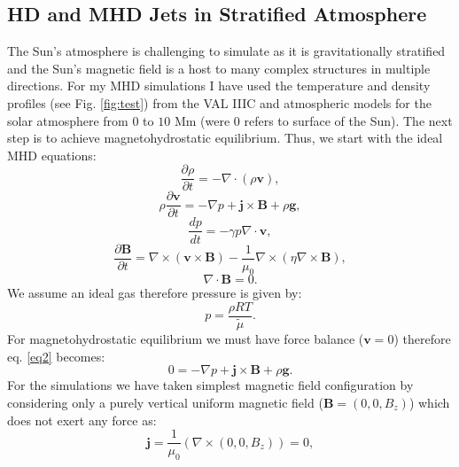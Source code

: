 \documentclass[12pt,a4paper,twoside]{article}
\begin{document}
\subsection{HD and MHD Jets in Stratified Atmosphere}
The Sun's atmosphere is challenging to simulate as it is gravitationally stratified and the Sun's magnetic field is a host to many complex structures in multiple directions. For my MHD simulations I have used the temperature and density profiles (see Fig. \ref{fig:test}) from the VAL IIIC \citep{Vernazza1981} and \cite{McWhirter1975} atmospheric models for the solar atmosphere from $0$ to $10$ Mm (were 0 refers to surface of the Sun). The next step is to achieve magnetohydrostatic equilibrium. Thus, we start with the ideal MHD equations: 
\begin{equation}\label{eq1}
\frac{\partial \rho}{\partial t} = - \nabla \cdot (\rho \boldsymbol{v} ) ,
\end{equation}
\begin{equation}\label{eq2}
\rho \frac{\partial \boldsymbol{v}}{\partial t} = -\nabla p + \boldsymbol{j} \times \boldsymbol{B} + \rho \boldsymbol{g} ,
\end{equation}
\begin{equation}\label{eq3}
\frac{d p}{d t} = - \gamma p \nabla \cdot \boldsymbol{v} ,
\end{equation}
\begin{equation}\label{eq4}
\frac{\partial \boldsymbol{B}}{\partial t} = \nabla \times (\boldsymbol{v} \times \boldsymbol{B}) - \frac{1}{\mu_0} \nabla \times ( \eta \nabla \times \boldsymbol{B} ) ,
\end{equation}
\begin{equation}\label{eq5}
\nabla \cdot \boldsymbol{B} = 0 .
\end{equation}
We assume an ideal gas therefore pressure is given by:
\begin{equation}\label{igl}
p = \frac{\rho R T}{\widetilde{\mu}}.
\end{equation}
For magnetohydrostatic equilibrium we must have force balance ($\boldsymbol{v}=0$) therefore eq. \eqref{eq2} becomes: 
\begin{equation}\label{eq6}
0 = - \nabla p + \boldsymbol{j} \times \boldsymbol{B} + \rho \boldsymbol{g} .
\end{equation} 
For the simulations we have taken simplest magnetic field configuration by considering only a purely vertical uniform magnetic field ($\boldsymbol{B} = (0,0,B_z)$) which does not exert any force as:
\begin{equation}
\boldsymbol{j} = \frac{1}{\mu_0} (\nabla \times (0,0,B_z)) = 0, 
\end{equation}
\end{document}

